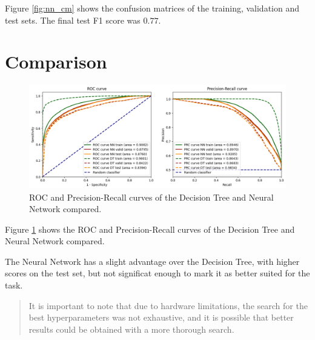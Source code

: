 Figure \ref{fig:nn_cm} shows the confusion matrices of the training, validation and test sets. The final test F1 score was $0.77$. 

\section{Comparison}

\begin{figure}[h]
    \centering
    \includegraphics[width=\textwidth]{images/Clustering/roc-prc.png}
    \caption{ROC and Precision-Recall curves of the Decision Tree and Neural Network compared.}
    \label{fig:roc}
\end{figure}

Figure \ref{fig:roc} shows the ROC and Precision-Recall curves of the Decision Tree and Neural Network compared. 

The Neural Network has a slight advantage over the Decision Tree, with higher scores on the test set, but not significat enough to mark it as better suited for the task.

\begin{quotation}
    \small
    It is important to note that due to hardware limitations, the search for the best hyperparameters was not exhaustive, and it is possible that better results could be obtained with a more thorough search.
\end{quotation}